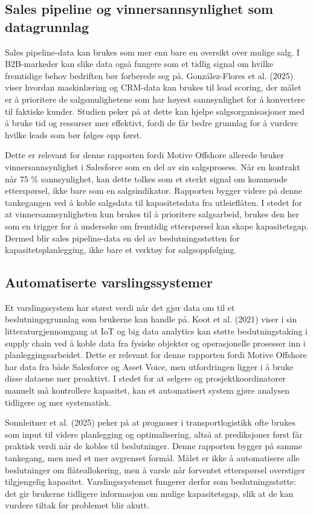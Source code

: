 \documentclass[a4paper,11pt]{article}
\begin{document}
\subsection{Sales pipeline og vinnersannsynlighet som datagrunnlag}

Sales pipeline-data kan brukes som mer enn bare en oversikt over mulige salg. I B2B-markeder kan slike data også fungere som et tidlig signal om hvilke fremtidige behov bedriften bør forberede seg på. González-Flores et al. (2025) viser hvordan maskinlæring og CRM-data kan brukes til lead scoring, der målet er å prioritere de salgsmulighetene som har høyest sannsynlighet for å konvertere til faktiske kunder. Studien peker på at dette kan hjelpe salgsorganisasjoner med å bruke tid og ressurser mer effektivt, fordi de får bedre grunnlag for å vurdere hvilke leads som bør følges opp først.

Dette er relevant for denne rapporten fordi Motive Offshore allerede bruker vinnersannsynlighet i Salesforce som en del av sin salgsprosess. Når en kontrakt når 75 \% sannsynlighet, kan dette tolkes som et sterkt signal om kommende etterspørsel, ikke bare som en salgsindikator. Rapporten bygger videre på denne tankegangen ved å koble salgsdata til kapasitetsdata fra utleieflåten. I stedet for at vinnersannsynligheten kun brukes til å prioritere salgsarbeid, brukes den her som en trigger for å undersøke om fremtidig etterspørsel kan skape kapasitetsgap. Dermed blir sales pipeline-data en del av beslutningsstøtten for kapasitetsplanlegging, ikke bare et verktøy for salgsoppfølging.

\subsection{Automatiserte varslingssystemer}

Et varslingssystem har størst verdi når det gjør data om til et beslutningsgrunnlag som brukerne kan handle på. Koot et al. (2021) viser i sin litteraturgjennomgang at IoT og big data analytics kan støtte beslutningstaking i supply chain ved å koble data fra fysiske objekter og operasjonelle prosesser inn i planleggingsarbeidet. Dette er relevant for denne rapporten fordi Motive Offshore har data fra både Salesforce og Asset Voice, men utfordringen ligger i å bruke disse dataene mer proaktivt. I stedet for at selgere og prosjektkoordinatorer manuelt må kontrollere kapasitet, kan et automatisert system gjøre analysen tidligere og mer systematisk.

Sonnleitner et al. (2025) peker på at prognoser i transportlogistikk ofte brukes som input til videre planlegging og optimalisering, altså at prediksjoner først får praktisk verdi når de kobles til beslutninger. Denne rapporten bygger på samme tankegang, men med et mer avgrenset formål. Målet er ikke å automatisere alle beslutninger om flåteallokering, men å varsle når forventet etterspørsel overstiger tilgjengelig kapasitet. Varslingssystemet fungerer derfor som beslutningsstøtte: det gir brukerne tidligere informasjon om mulige kapasitetsgap, slik at de kan vurdere tiltak før problemet blir akutt.
\end{document}
